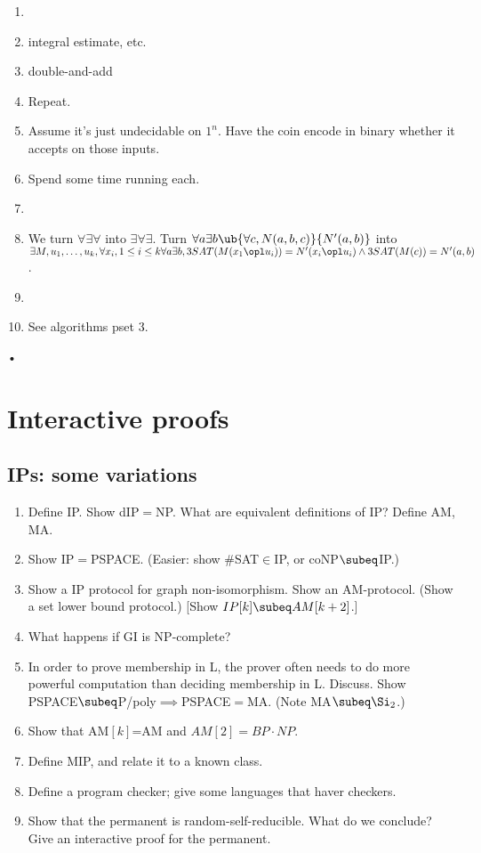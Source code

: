 \begin{enumerate}
\item
\item integral estimate, etc.
\item double-and-add
\item Repeat.
\item Assume it's just undecidable on $1^n$. Have the coin encode in binary whether it accepts on those inputs. 
\item Spend some time running each.
\item
\item We turn $\forall\exists\forall$ into $\exists\forall\exists$.
Turn $\forall a\exists b\ub{\forall c , N(a,b,c)}{N'(a,b)}$ into $\exists M, u_1,\ldots, u_k, \forall x_i, 1\le i\le k \forall a\exists b, 3SAT(M(x_1\opl u_i))=N'(x_i\opl u_i)\wedge 3SAT(M(c))=N'(a,b)$.
\item
\item See algorithms pset 3.
\end{enumerate}•
\section{Interactive proofs}
\subsection{IPs: some variations}
\begin{enumerate}
\item
Define IP. Show dIP$=$NP. What are equivalent definitions of IP? Define AM, MA. 
\item
Show IP$=$PSPACE. (Easier: show $\#$SAT$\in$IP, or coNP$\subeq $IP.)
\item Show a IP protocol for graph non-isomorphism. Show an AM-protocol. (Show a set lower bound protocol.) [Show $IP[k]\subeq AM[k+2]$.] 
\item What happens if GI is NP-complete?
\item In order to prove membership in L, the prover often needs to do more powerful computation than deciding membership in L. Discuss. Show PSPACE$\subeq$P/poly$\implies$PSPACE$=$MA. (Note MA$\subeq \Si_2$.)
\item Show that AM$[k]$=AM and $AM[2]=BP\cdot NP$. 
\item Define MIP, and relate it to a known class.
\item Define a program checker; give some languages that haver checkers.
\item Show that the permanent is random-self-reducible. What do we conclude? Give an interactive proof for the permanent.
\end{enumerate}

